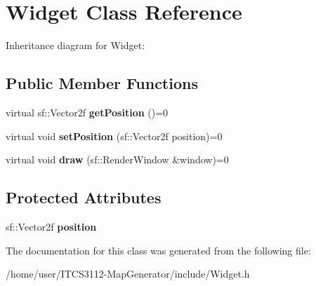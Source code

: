 \hypertarget{classWidget}{}\section{Widget Class Reference}
\label{classWidget}


Inheritance diagram for Widget\+:
\subsection*{Public Member Functions}
\begin{DoxyCompactItemize}
\item 
\mbox{\label{classWidget_a40bb2c0367aa1cd038162ccb44fde73a}} 
virtual sf\+::\+Vector2f {\bfseries get\+Position} ()=0
\item 
\mbox{\label{classWidget_a834da014cb954d3827105eb340b55710}} 
virtual void {\bfseries set\+Position} (sf\+::\+Vector2f position)=0
\item 
\mbox{\label{classWidget_afaf30b48c85ad503300e0f4a679fbcac}} 
virtual void {\bfseries draw} (sf\+::\+Render\+Window \&window)=0
\end{DoxyCompactItemize}
\subsection*{Protected Attributes}
\begin{DoxyCompactItemize}
\item 
\mbox{\label{classWidget_a30140ad659fe6989665dcb846ad6e80b}} 
sf\+::\+Vector2f {\bfseries position}
\end{DoxyCompactItemize}


The documentation for this class was generated from the following file\+:\begin{DoxyCompactItemize}
\item 
/home/user/\+I\+T\+C\+S3112-\/\+Map\+Generator/include/Widget.\+h\end{DoxyCompactItemize}
